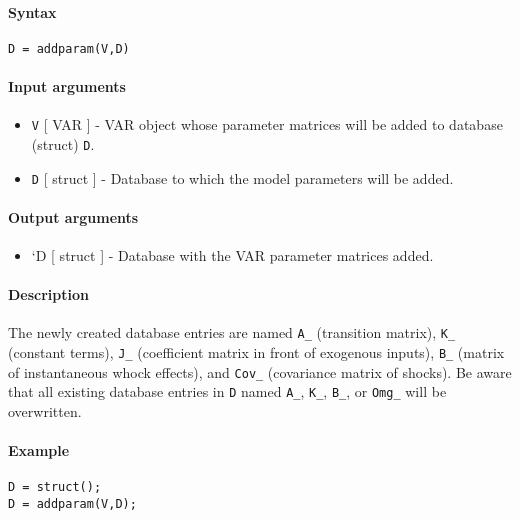 


	\paragraph{Syntax}\label{syntax}

\begin{verbatim}
D = addparam(V,D)
\end{verbatim}

\paragraph{Input arguments}\label{input-arguments}

\begin{itemize}
\item
  \texttt{V} {[} VAR {]} - VAR object whose parameter matrices will be
  added to database (struct) \texttt{D}.
\item
  \texttt{D} {[} struct {]} - Database to which the model parameters
  will be added.
\end{itemize}

\paragraph{Output arguments}\label{output-arguments}

\begin{itemize}
\itemsep1pt\parskip0pt
\item
  `D {[} struct {]} - Database with the VAR parameter matrices added.
\end{itemize}

\paragraph{Description}\label{description}

The newly created database entries are named \texttt{A\_} (transition
matrix), \texttt{K\_} (constant terms), \texttt{J\_} (coefficient matrix
in front of exogenous inputs), \texttt{B\_} (matrix of instantaneous
whock effects), and \texttt{Cov\_} (covariance matrix of shocks). Be
aware that all existing database entries in \texttt{D} named
\texttt{A\_}, \texttt{K\_}, \texttt{B\_}, or \texttt{Omg\_} will be
overwritten.

\paragraph{Example}\label{example}

\begin{verbatim}
D = struct();
D = addparam(V,D);
\end{verbatim}


